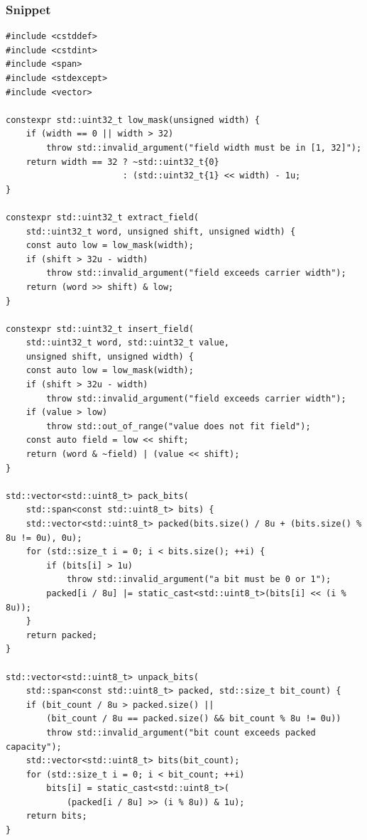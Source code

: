 \subsubsection{Snippet}\label{appendix-4e2236f53445-snippet}

\hypertarget{appendix-4e2236f53445-snippet}{}

\begin{verbatim}
#include <cstddef>
#include <cstdint>
#include <span>
#include <stdexcept>
#include <vector>

constexpr std::uint32_t low_mask(unsigned width) {
    if (width == 0 || width > 32)
        throw std::invalid_argument("field width must be in [1, 32]");
    return width == 32 ? ~std::uint32_t{0}
                       : (std::uint32_t{1} << width) - 1u;
}

constexpr std::uint32_t extract_field(
    std::uint32_t word, unsigned shift, unsigned width) {
    const auto low = low_mask(width);
    if (shift > 32u - width)
        throw std::invalid_argument("field exceeds carrier width");
    return (word >> shift) & low;
}

constexpr std::uint32_t insert_field(
    std::uint32_t word, std::uint32_t value,
    unsigned shift, unsigned width) {
    const auto low = low_mask(width);
    if (shift > 32u - width)
        throw std::invalid_argument("field exceeds carrier width");
    if (value > low)
        throw std::out_of_range("value does not fit field");
    const auto field = low << shift;
    return (word & ~field) | (value << shift);
}

std::vector<std::uint8_t> pack_bits(
    std::span<const std::uint8_t> bits) {
    std::vector<std::uint8_t> packed(bits.size() / 8u + (bits.size() % 8u != 0u), 0u);
    for (std::size_t i = 0; i < bits.size(); ++i) {
        if (bits[i] > 1u)
            throw std::invalid_argument("a bit must be 0 or 1");
        packed[i / 8u] |= static_cast<std::uint8_t>(bits[i] << (i % 8u));
    }
    return packed;
}

std::vector<std::uint8_t> unpack_bits(
    std::span<const std::uint8_t> packed, std::size_t bit_count) {
    if (bit_count / 8u > packed.size() ||
        (bit_count / 8u == packed.size() && bit_count % 8u != 0u))
        throw std::invalid_argument("bit count exceeds packed capacity");
    std::vector<std::uint8_t> bits(bit_count);
    for (std::size_t i = 0; i < bit_count; ++i)
        bits[i] = static_cast<std::uint8_t>(
            (packed[i / 8u] >> (i % 8u)) & 1u);
    return bits;
}
\end{verbatim}


